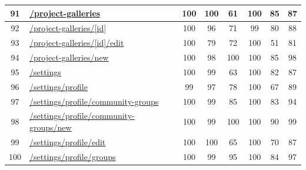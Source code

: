 \begin{longtable}{|c|p{5cm}|c|c|c|c|c|c|}
      \hline
      91                                       & \url{/project-galleries}                                   & 100              & 100              & 61               & 100              & 85               & 87            \\
      \hline
      92                                       & \url{/project-galleries/[id]}                              & 100              & 96               & 71               & 99               & 80               & 88            \\
      \hline
      93                                       & \url{/project-galleries/[id]/edit}                         & 100              & 79               & 72               & 100              & 51               & 81            \\
      \hline
      94                                       & \url{/project-galleries/new}                               & 100              & 98               & 100              & 100              & 85               & 98            \\
      \hline
      95                                       & \url{/settings}                                            & 100              & 99               & 63               & 100              & 82               & 87            \\
      \hline
      96                                       & \url{/settings/profile}                                    & 99               & 97               & 78               & 100              & 67               & 89            \\
      \hline
      97                                       & \url{/settings/profile/community-groups}                   & 100              & 99               & 85               & 100              & 83               & 94            \\
      \hline
      98                                       & \url{/settings/profile/community-groups/new}               & 100              & 99               & 100              & 100              & 90               & 99            \\
      \hline
      99                                       & \url{/settings/profile/edit}                               & 100              & 100              & 65               & 100              & 70               & 87            \\
      \hline
      100                                      & \url{/settings/profile/groups}                             & 100              & 99               & 95               & 100              & 84               & 97            \\

\end{longtable}
